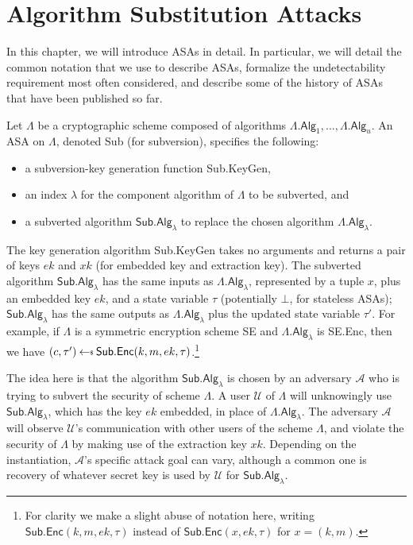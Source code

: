 \chapter{Algorithm Substitution Attacks} \label{sec:ASA}

In this chapter, we will introduce ASAs in detail. In particular, we will detail the common notation that we use to describe ASAs, formalize the undetectability requirement most often considered, and describe some of the history of ASAs that have been published so far.

Let $\mathsf{\Lambda}$ be a cryptographic scheme composed of algorithms $\mathsf{\Lambda.Alg}_1,..., \mathsf{\Lambda.Alg}_u$. An ASA on $\mathsf{\Lambda}$, denoted \textsf{Sub} (for subversion), specifies the following:
\begin{itemize}
\item a subversion-key generation function \textsf{Sub.KeyGen},
\item an index $\lambda$ for the component algorithm of $\mathsf{\Lambda}$ to be subverted, and
\item a subverted algorithm $\mathsf{Sub.Alg}_\lambda$ to replace the chosen algorithm $\mathsf{\Lambda.Alg}_\lambda$.
\end{itemize}

The key generation algorithm \textsf{Sub.KeyGen} takes no arguments and returns a pair of keys $ek$ and $xk$ (for embedded key and extraction key). The subverted algorithm $\mathsf{Sub.Alg}_\lambda$ has the same inputs as $\mathsf{\Lambda.Alg}_\lambda$, represented by a tuple $x$, plus an embedded key $ek$, and a state variable $\tau$ (potentially $\bot$, for stateless ASAs); $\mathsf{Sub.Alg}_\lambda$ has the same outputs as $\mathsf{\Lambda.Alg}_\lambda$ plus the updated state variable $\tau'$. For example, if $\mathsf{\Lambda}$ is a symmetric encryption scheme \textsf{SE} and $\mathsf{\Lambda.Alg}_\lambda$ is \textsf{SE.Enc}, then we have $(c, \tau') \sample \mathsf{Sub.Enc}(k, m, ek, \tau)$.\footnote{For clarity we make a slight abuse of notation here, writing $\mathsf{Sub.Enc}(k, m, ek, \tau)$ instead of $\mathsf{Sub.Enc}(x, ek, \tau)$ for $x=(k, m)$.}

The idea here is that the algorithm $\mathsf{Sub.Alg}_\lambda$ is chosen by an adversary $\mathcal{A}$ who is trying to subvert the security of scheme $\mathsf{\Lambda}$. A user $\mathcal{U}$ of $\mathsf{\Lambda}$ will unknowingly use $\mathsf{Sub.Alg}_\lambda$, which has the key $ek$ embedded, in place of $\mathsf{\Lambda.Alg}_\lambda$. The adversary $\mathcal{A}$ will observe $\mathcal{U}$'s communication with other users of the scheme $\mathsf{\Lambda}$, and violate the security of $\mathsf{\Lambda}$ by making use of the extraction key $xk$. Depending on the instantiation, $\mathcal{A}$'s specific attack goal can vary, although a common one is recovery of whatever secret key is used by $\mathcal{U}$ for $\mathsf{Sub.Alg}_\lambda$.

